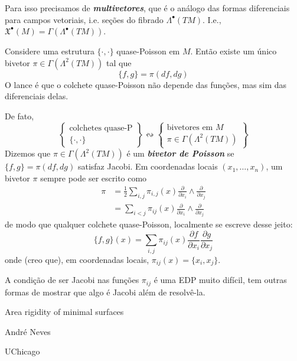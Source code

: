Para isso precisamos de \textit{\textbf{multivetores}}, que é o análogo das formas diferenciais para campos vetoriais, i.e. seções do fibrado \(\Lambda^{\bullet}(TM)\). I.e., \(\mathfrak{X}^\bullet(M)=\Gamma(\Lambda^{\bullet}(TM))\).

Considere uma estrutura \(\{\cdot ,\cdot \}\) quase-Poisson em \(M\). Então existe um único bivetor \(\pi \in \Gamma(\Lambda^{2}(TM))\) tal que
\[\{f,g\}=\pi(df,dg)\]
O lance é que o colchete quase-Poisson não depende das funções, mas sim das diferenciais delas.

De fato,
\[\left\{ \substack{\text{colchetes quase-P}  \\ \{\cdot ,\cdot \}} \right\} \leftrightsquigarrow \left\{ \substack{\text{bivetores em \(M\)}  \\ \pi \in \Gamma(\Lambda^{2}(TM))} \right\} \]
Dizemos que \(\pi \in \Gamma(\Lambda^{2}(TM))\) é um \textit{\textbf{bivetor de Poisson}} se \(\{f,g\}=\pi(df,dg)\) satisfaz Jacobi. Em coordenadas locais \((x_1,\ldots,x_n)\), um bivetor \(\pi\) sempre pode ser escrito como
\begin{align*}
\pi&=\frac{1}{2}\sum_{i,j}\pi_{i,j}(x) \frac{\partial }{\partial x_i}\wedge \frac{\partial }{\partial x_j}\\
&=\sum_{i<j}\pi_{ij}(x)\frac{\partial }{\partial x_i}\wedge\frac{\partial }{\partial x_j}
\end{align*}
de modo que qualquer colchete quase-Poisson, localmente se escreve desse jeito:
\[\{f,g\}(x)=\sum_{i,j}\pi_{ij}(x)\frac{\partial f}{\partial x_i}\frac{\partial g}{\partial x_j}\]
onde (creo que), em coordenadas locais, \(\pi_{ij}(x)=\{x_i,x_j\}\).
\begin{remark}\leavevmode
	A condição de ser Jacobi nas funções \(\pi_{ij}\) é uma EDP muito difícil, tem outras formas de mostrar que algo é Jacobi além de resolvê-la.
\end{remark}


\clearpage{}
{\Huge Area rigidity of minimal surfaces}

\hfill{\Large André Neves}

{\Large \hfill UChicago}

